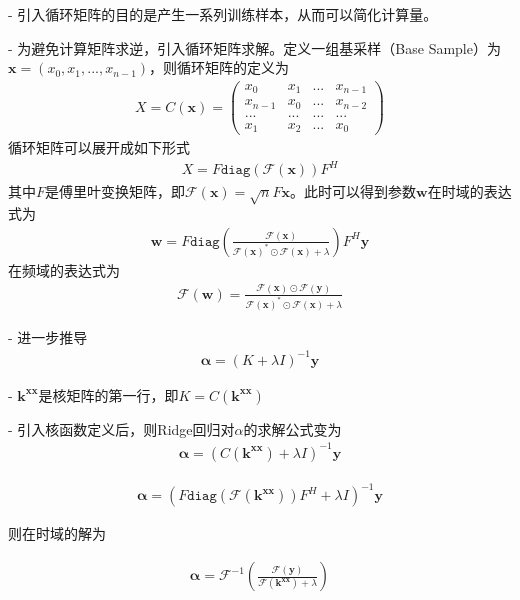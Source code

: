 - 引入循环矩阵的目的是产生一系列训练样本，从而可以简化计算量。

- 为避免计算矩阵求逆，引入循环矩阵求解。定义一组基采样（Base Sample）为$\mathbf{x}=(x_0, x_1, ..., x_{n-1})$，则循环矩阵的定义为
\begin{align}
X=C(\mathbf{x})=\begin{pmatrix}x_{0}&x_{1}&...&x_{n-1}\\x_{n-1}&x_{0}&...&x_{n-2}\\...&...&...&...\\x_{1}&x_{2}&...&x_{0}\end{pmatrix}
\end{align}
循环矩阵可以展开成如下形式
\begin{align}
X=F \mathtt{diag} (\mathcal{F(\mathbf{x})})F^H
\end{align}
其中$F$是傅里叶变换矩阵，即$\mathcal{F}(\mathbf{x})=\sqrt{n}F\mathbf{x}$。此时可以得到参数$\mathbf{w}$在时域的表达式为
\begin{align}
\mathbf{w}=F\mathtt{diag}(\frac{\mathcal{F}(\mathbf{x})}{\mathcal{F}(\mathbf{x})^*\odot\mathcal{F}(\mathbf{x})+\lambda})F^H\mathbf{y}
\end{align}
在频域的表达式为
\begin{align}
\mathcal{F}(\mathbf{w})=\frac{\mathcal{F}(\mathbf{x})\odot\mathcal{F}(\mathbf{y})}{\mathcal{F}(\mathbf{x})^*\odot\mathcal{F}(\mathbf{x})+\lambda}
\end{align}

- 进一步推导
\begin{align}
\mathbf{\alpha}=(K+\lambda I)^{-1}\mathbf{y}
\end{align}

- $\mathbf{k}^{\mathbf{xx}}$是核矩阵的第一行，即$K=C(\mathbf{k}^{\mathbf{xx}})$

- 引入核函数定义后，则Ridge回归对$\alpha$的求解公式变为
\begin{align}
\mathbf{\alpha}=(C(\mathbf{k}^{\mathbf{xx}})+\lambda I)^{-1}\mathbf{y}
\end{align}

\begin{align}
\mathbf{\alpha}=(F\mathtt{diag}(\mathcal{F}(\mathbf{k}^{\mathbf{xx}}))F^H+\lambda I)^{-1}\mathbf{y}
\end{align}

则在时域的解为

\begin{align}
\mathbf{\alpha}=\mathcal{F}^{-1}(\frac{\mathcal{F}(\mathbf{y})}{\mathcal{F}(\mathbf{k}^{\mathbf{xx}})+\lambda})
\end{align}


